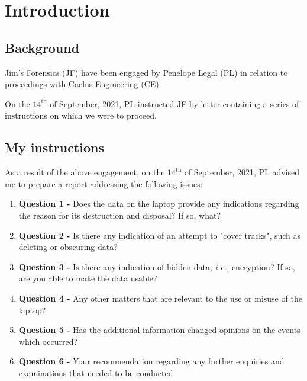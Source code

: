 \section{Introduction} %
\label{sec:introduction}

\subsection{Background} %
\label{sub:background}

\begin{myenum}
    \item Jim's Forensics (JF) have been engaged by Penelope Legal (PL) in relation to proceedings with Caelus Engineering (CE).
    \item On the $14^\text{th}$ of September, 2021, PL instructed JF by letter containing a series of instructions on which we were to proceed.
\end{myenum}


\subsection{My instructions} %
\label{sub:my_instructions}

\begin{myenum}
\item As a result of the above engagement, on the $14^\text{th}$ of September, 2021, PL advised me to prepare a report addressing the following issues:
    \begin{enumerate}
        \item \textbf{Question 1 -} Does the data on the laptop provide any indications regarding the reason for its destruction and disposal? If so, what?
        \item \textbf{Question 2 -} Is there any indication of an attempt to "cover tracks", such as deleting or obscuring data?
        \item \textbf{Question 3 - } Is there any indication of hidden data, \emph{i.e.,} encryption? If so, are you able to make the data usable?
        \item \textbf{Question 4 - } Any other matters that are relevant to the use or misuse of the laptop?
        \item \textbf{Question 5 - } Has the additional information changed opinions on the events which occurred?
        \item \textbf{Question 6 - } Your recommendation regarding any further enquiries and examinations that needed to be conducted.
    \end{enumerate}
\end{myenum}

